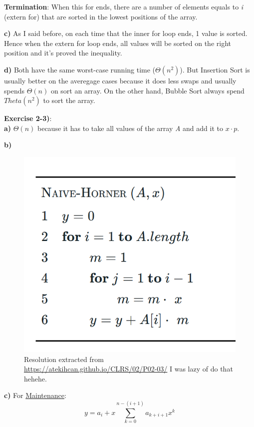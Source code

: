 \documentclass{article}
\newcounter{exercise}[section]   %
\begin{document}
\textbf{Termination}: When this for ends, there are a number of elements equals to \textit{i} 
(extern for) that are sorted in the lowest positions of the array.

\textbf{c)} As I said before, on each time that the inner for loop ends, 1 value is sorted.
Hence when the extern for loop ends, all values will be sorted on the right position and it's
proved the inequality.

\textbf{d)} Both have the same worst-case running time (\(\Theta(n^2)\)). But Insertion
Sort is usually better on the averegage cases because it does less swaps and usually spends
\(\Theta(n)\) on sort an array. On the other hand, Bubble Sort always spend \(Theta(n^2)\)
to sort the array. 

\textbf{Exercise 2-3)}:\\
\textbf{a)} \(\Theta(n)\) because it has to take all values of the array \textit{A} and 
add it to \(x \cdot p\).

\textbf{b)}
\begin{figure}[h]
    \includegraphics[scale=0.3]{Problem2_3_b}
    \centering
    \caption{Resolution extracted from \href{https://atekihcan.github.io/CLRS/02/P02-03/}
    {https://atekihcan.github.io/CLRS/02/P02-03/} I was lazy of do that hehehe.}
\end{figure}

\textbf{c)}
For \underline{Maintenance}:
\[
y = a_i + x \sum_{k=0}^{n-(i+1)} a_{k+i+1} x^k
\]
\end{document}

